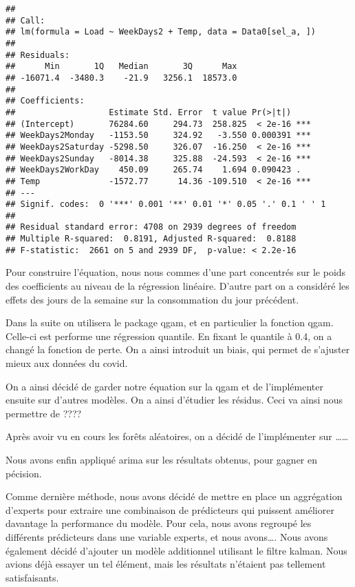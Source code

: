 \documentclass[
]{article}
\newenvironment{Shaded}{\begin{snugshade}}{\end{snugshade}}
\newcommand{\CommentTok}[1]{\textcolor[rgb]{0.56,0.35,0.01}{\textit{#1}}}
\begin{document}
\begin{verbatim}
## 
## Call:
## lm(formula = Load ~ WeekDays2 + Temp, data = Data0[sel_a, ])
## 
## Residuals:
##      Min       1Q   Median       3Q      Max 
## -16071.4  -3480.3    -21.9   3256.1  18573.0 
## 
## Coefficients:
##                   Estimate Std. Error  t value Pr(>|t|)    
## (Intercept)       76284.60     294.73  258.825  < 2e-16 ***
## WeekDays2Monday   -1153.50     324.92   -3.550 0.000391 ***
## WeekDays2Saturday -5298.50     326.07  -16.250  < 2e-16 ***
## WeekDays2Sunday   -8014.38     325.88  -24.593  < 2e-16 ***
## WeekDays2WorkDay    450.09     265.74    1.694 0.090423 .  
## Temp              -1572.77      14.36 -109.510  < 2e-16 ***
## ---
## Signif. codes:  0 '***' 0.001 '**' 0.01 '*' 0.05 '.' 0.1 ' ' 1
## 
## Residual standard error: 4708 on 2939 degrees of freedom
## Multiple R-squared:  0.8191, Adjusted R-squared:  0.8188 
## F-statistic:  2661 on 5 and 2939 DF,  p-value: < 2.2e-16
\end{verbatim}

Pour construire l'équation, nous nous commes d'une part concentrés sur
le poids des coefficients au niveau de la régression linéaire. D'autre
part on a considéré les effets des jours de la semaine sur la
consommation du jour précédent.

Dans la suite on utilisera le package qgam, et en particulier la
fonction qgam. Celle-ci est performe une régression quantile. En fixant
le quantile à 0.4, on a changé la fonction de perte. On a ainsi
introduit un biais, qui permet de s'ajuster mieux aux données du covid.

On a ainsi décidé de garder notre équation sur la qgam et de
l'implémenter ensuite sur d'autres modèles. On a ainsi d'étudier les
résidus. Ceci va ainsi nous permettre de ????

Après avoir vu en cours les forêts aléatoires, on a décidé de
l'implémenter sur \ldots\ldots{}

Nous avons enfin appliqué arima sur les résultats obtenus, pour gagner
en pécision.

\begin{Shaded}
\end{Shaded}

Comme dernière méthode, nous avons décidé de mettre en place un
aggrégation d'experts pour extraire une combinaison de prédicteurs qui
puissent améliorer davantage la performance du modèle. Pour cela, nous
avons regroupé les différents prédicteurs dans une variable experts, et
nous avons\ldots. Nous avons également décidé d'ajouter un modèle
additionnel utilisant le filtre kalman. Nous avions déjà essayer un tel
élément, mais les résultats n'étaient pas tellement satisfaisants.
\end{document}
